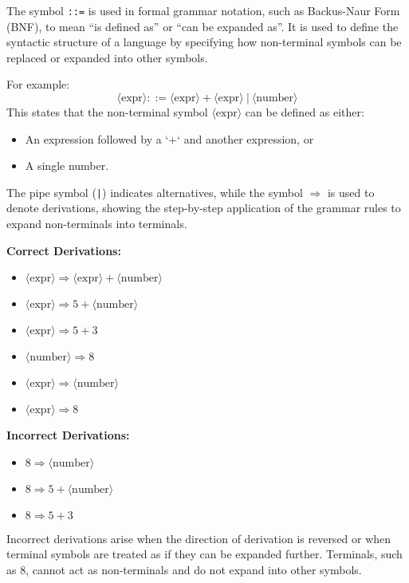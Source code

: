 \newpage

\begin{Def}[Symbol ``\texttt{::=}'']
    The symbol \texttt{::=} is used in formal grammar notation, such as Backus-Naur Form (BNF), 
    to mean ``is defined as'' or ``can be expanded as''. It is used to define the syntactic structure 
    of a language by specifying how non-terminal symbols can be replaced or expanded into other symbols.

    \vspace{1em}
    \noindent
    For example:
    \[
    \langle \text{expr} \rangle ::= \langle \text{expr} \rangle + \langle \text{expr} \rangle \ | \ \langle \text{number} \rangle
    \]
    This states that the non-terminal symbol $\langle \text{expr} \rangle$ can be defined as either:
    \begin{itemize}
        \item An expression followed by a `+` and another expression, or
        \item A single number.
    \end{itemize}

    \vspace{1em}
    The pipe symbol (\texttt{|}) indicates alternatives, while the symbol $\Rightarrow$ is used to denote derivations, 
    showing the step-by-step application of the grammar rules to expand non-terminals into terminals.

    \vspace{1em}
    \noindent
    \textbf{Correct Derivations:}
    \begin{itemize}
        \item $\langle \text{expr} \rangle \Rightarrow \langle \text{expr} \rangle + \langle \text{number} \rangle$
        \item $\langle \text{expr} \rangle \Rightarrow 5 + \langle \text{number} \rangle$
        \item $\langle \text{expr} \rangle \Rightarrow 5 + 3$
        \item $\langle \text{number} \rangle \Rightarrow 8$
        \item $\langle \text{expr} \rangle \Rightarrow \langle \text{number} \rangle$
        \item $\langle \text{expr} \rangle \Rightarrow 8$
    \end{itemize}

    \vspace{1em}
    \noindent
    \textbf{Incorrect Derivations:}
    \begin{itemize}
        \item $8 \Rightarrow \langle \text{number} \rangle$ 
        \item $8 \Rightarrow 5 + \langle \text{number} \rangle$
        \item $8 \Rightarrow 5 + 3$
    \end{itemize}

    \vspace{1em}
    Incorrect derivations arise when the direction of derivation is reversed or when terminal symbols are treated as if they 
    can be expanded further. Terminals, such as $8$, cannot act as non-terminals and do not expand into other symbols.
\end{Def}
